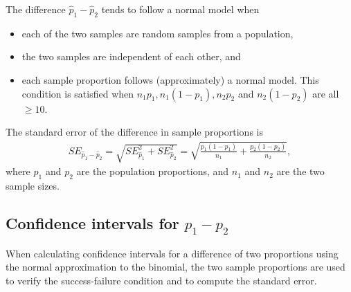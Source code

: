 \begin{termBox}{
The difference $\hat{p}_1 - \hat{p}_2$ tends to follow a normal model when
\begin{itemize}
\setlength{\itemsep}{0mm}
\item each of the two samples are random samples from a population,
\item the two samples are independent of each other, and
\item each sample proportion follows (approximately) a normal model. This condition is satisfied when $n_1p_1, n_1(1 - p_1), n_2 p_2$ and $n_2(1 - p_2)$ are all $\geq 10$.
\end{itemize}
The standard error of the difference in sample proportions is
\begin{eqnarray}
SE_{\hat{p}_1 - \hat{p}_2}
	= \sqrt{SE_{\hat{p}_1}^2 + SE_{\hat{p}_2}^2}
	= \sqrt{\frac{p_1(1-p_1)}{n_1} + \frac{p_2(1-p_2)}{n_2}},
\label{seForDiffOfProp}
\end{eqnarray}
where $p_1$ and $p_2$ are the population proportions, and $n_1$ and $n_2$ are the two sample sizes.}
\end{termBox}


\subsection{Confidence intervals for $p_1 - p_2$}
\label{confidenceIntervalsDifferenceProportions}

When calculating confidence intervals for a difference of two proportions using the normal approximation to the binomial, the two sample proportions are used to verify the success-failure condition and to compute the standard error.

